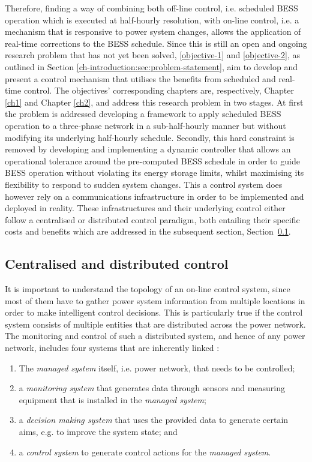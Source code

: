 Therefore, finding a way of combining both off-line control, i.e. scheduled BESS operation which is executed at half-hourly resolution, with on-line control, i.e. a mechanism that is responsive to power system changes, allows the application of real-time corrections to the BESS schedule.
Since this is still an open and ongoing research problem that has not yet been solved, \ref{objective-1} and \ref{objective-2}, as outlined in Section \ref{ch-introduction:sec:problem-statement}, aim to develop and present a control mechanism that utilises the benefits from scheduled and real-time control.
The objectives' corresponding chapters are, respectively, Chapter \ref{ch1} and Chapter \ref{ch2}, and address this research problem in two stages.
At first the problem is addressed developing a framework to apply scheduled BESS operation to a three-phase network in a sub-half-hourly manner but without modifying its underlying half-hourly schedule.
Secondly, this hard constraint is removed by developing and implementing a dynamic controller that allows an operational tolerance around the pre-computed BESS schedule in order to guide BESS operation without violating its energy storage limits, whilst maximising its flexibility to respond to sudden system changes.
This a control system does however rely on a communications infrastructure in order to be implemented and deployed in reality.
These infrastructures and their underlying control either follow a centralised or distributed control paradigm, both entailing their specific costs and benefits which are addressed in the subsequent section, Section~\ref{ch-literature:subsec:centralised-and-distributed-control}.

\subsection{Centralised and distributed control}
\label{ch-literature:subsec:centralised-and-distributed-control}

It is important to understand the topology of an on-line control system, since most of them have to gather power system information from multiple locations in order to make intelligent control decisions.
This is particularly true if the control system consists of multiple entities that are distributed across the power network.
The monitoring and control of such a distributed system, and hence of any power network, includes four systems that are inherently linked \cite{Mansouri-Samani1993}:

\begin{enumerate}
	\item The \textit{managed system} itself, i.e. power network, that needs to be controlled;
	\item a \textit{monitoring system} that generates data through sensors and measuring equipment that is installed in the \textit{managed system};
	\item a \textit{decision making system} that uses the provided data to generate certain aims, e.g. to improve the system state; and
	\item a \textit{control system} to generate control actions for the \textit{managed system}.
\end{enumerate}

